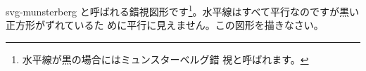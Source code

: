 {svg-munsterberg}{%
と呼ばれる錯視図形です\footnote{水平線が黒の場合にはミュンスターベルグ錯
 視と呼ばれます。}。水平線はすべて平行なのですが黒い正方形がずれているた
 めに平行に見えません。この図形を描きなさい。}
 \iffalse
{%
\subsection{錯視とデザイン}
図\ref{font-design}はフォントのデザインでは錯視によりフォントが醜くならな
いようにしています。ここで使われているフォントは Adobe が開発した 
ページ記述言語\keyitem{PostScript} のクローンである
\keyitem{GhostScript} に添付されている Helvetica Bold です。下の
部分で罫線をいれてこれらのデザインの違いが分かるように
しています。
\ShowFig{0.7}{ht}{font-design}{フォントにおける錯視の回避}
{font-design}

このフォントでは次のような点が考慮されてデザインされています。
\begin{itemize}
 \item \texttt{A}の横線は高さの中心にありません。中央にあるとその上の三
       角形の白い部分が小さくなって見にくくなるからです。
 \item \texttt{E}の中央の横線は上下の横線から同じだけ離れていません。少
       し上にあります。少し上にあることで中央にあるように見えるからです。
 \item \texttt{E}の横線の太さと縦線の太さが違います。
       縦線のほうが細く見える尾で同じ印象を与えるために縦線を少し太くし
       ています。
 \item \texttt{X}を構成する斜線の輪郭は同じ方向で傾きが異なっています。
       これはポッケンドルフの錯視を避けるためのデザインです。
\end{itemize}
\begin{Problem}\upshape
 Windows に付属するフォントを大きく表示して他の文字でも錯視による影響を
 避けるようなデザインをしているか調べなさい。
\end{Problem}
}
\fi